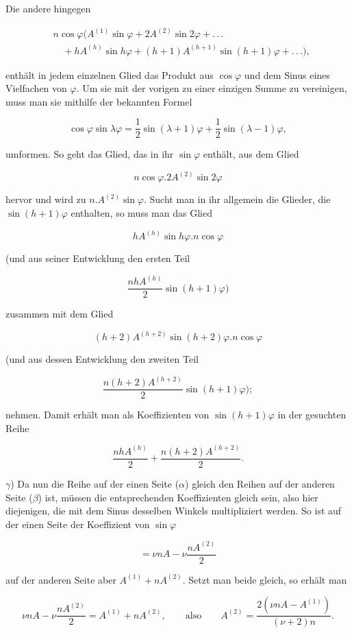 \par\noindent{}%
\hspace*{\parindent}Die andere hingegen

\[
\begin{aligned}
&n\cos\varphi\bigl(A^{(1)}\sin\varphi+2A^{(2)}\sin2\varphi+.\,.\,.\\&\quad+hA^{(h)}\sin h\varphi+(h+1)A^{(h+1)}\sin(h+1)\varphi+.\,.\,.\bigr),
\end{aligned}
\]

\noindent enthält in jedem einzelnen Glied das Produkt aus $\cos\varphi$ und dem Sinus eines Vielfachen von $\varphi$. Um sie mit der vorigen zu einer einzigen Summe zu vereinigen, muss man sie mithilfe der bekannten Formel

\[
\cos\varphi\sin\lambda\varphi=\frac{1}{2}\sin(\lambda+1)\varphi+\frac{1}{2}\sin(\lambda-1)\varphi,
\]

\noindent umformen. So geht das Glied, das in ihr $\sin\varphi$ enthält, aus dem Glied

\[
n\cos\varphi.2A^{(2)}\sin2\varphi
\]

\noindent hervor und wird zu $n.A^{(2)}\sin\varphi$. Sucht man in ihr allgemein die Glieder, die $\sin(h+1)\varphi$ enthalten, so muss man das Glied

\[
hA^{(h)}\sin h\varphi.n\cos\varphi
\]

\noindent (und aus seiner Entwicklung den ersten Teil

\[
\frac{nhA^{(h)}}{2}\sin(h+1)\varphi)
\]

\noindent zusammen mit dem Glied

\[
(h+2)A^{(h+2)}\sin(h+2)\varphi.n\cos\varphi
\]

\noindent (und aus dessen Entwicklung den zweiten Teil

\[
\frac{n(h+2)A^{(h+2)}}{2}\sin(h+1)\varphi);
\]

\noindent nehmen. Damit erhält man als Koeffizienten von $\sin(h+1)\varphi$ in der gesuchten Reihe

\[
\frac{nhA^{(h)}}{2}+\frac{n(h+2)A^{(h+2)}}{2}.
\]

$\gamma$) Da nun die Reihe auf der einen Seite ($\alpha$) gleich den Reihen auf der anderen Seite ($\beta$) ist, müssen die entsprechenden Koeffizienten gleich sein, also hier diejenigen, die mit dem Sinus desselben Winkels multipliziert werden. So ist auf der einen Seite der Koeffizient von $\sin\varphi$

\[
=\nu nA-\nu\frac{nA^{(2)}}{2}
\]

\noindent auf der anderen Seite aber $A^{(1)}+nA^{(2)}$. Setzt man beide gleich, so erhält man

\[
\nu nA-\nu\frac{nA^{(2)}}{2}=A^{(1)}+nA^{(2)},\qquad\mbox{also}\qquad A^{(2)}=\frac{2(\nu nA-A^{(1)})}{(\nu+2)n}.
\]


